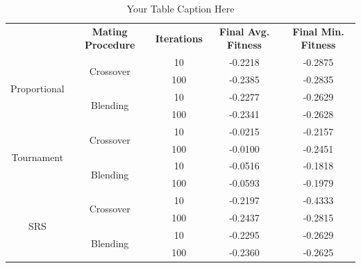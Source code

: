 \documentclass[10pt]{article}
\begin{document}
\begin{table}[H]
    \centering
    \begin{tabular}{|*{5}{c|}}
        \hline
        \renewcommand{\arraystretch}{1.5}
        \multirow{2}{*}{\textbf{Selection Method}} & \multirow{2}{*}{\textbf{Mating Procedure}} & \multirow{2}{*}{\textbf{Iterations}} & \multirow{2}{*}{\textbf{Final Avg. Fitness}} & \multirow{2}{*}{\textbf{Final Min. Fitness}} \\
        & & & & \\
        \hline
        \multirow{4}{*}{Proportional} & \multirow{2}{*}{Crossover} & 10 & -0.2218 & -0.2875 \\
        & &\cellcolor{lightgray} 100 &\cellcolor{lightgray} -0.2385 &\cellcolor{lightgray} -0.2835 \\
        \cline{2-5}
        & \multirow{2}{*}{Blending} & 10 & -0.2277 & -0.2629 \\
        & &\cellcolor{lightgray} 100 &\cellcolor{lightgray} -0.2341 & \cellcolor{lightgray} -0.2628 \\
        \hline
        \multirow{4}{*}{Tournament} & \multirow{2}{*}{Crossover} & 10 & -0.0215 & -0.2157 \\
        & &\cellcolor{lightgray} 100 &\cellcolor{lightgray} -0.0100 &\cellcolor{lightgray} -0.2451 \\
        \cline{2-5}
        & \multirow{2}{*}{Blending} & 10 & -0.0516 & -0.1818 \\
        & &\cellcolor{lightgray} 100 &\cellcolor{lightgray} -0.0593 &\cellcolor{lightgray} -0.1979 \\
        \hline
        \multirow{4}{*}{SRS} & \multirow{2}{*}{Crossover} & 10 & -0.2197 & -0.4333 \\
        & &\cellcolor{lightgray} 100 &\cellcolor{lightgray} -0.2437 &\cellcolor{lightgray} -0.2815 \\
        \cline{2-5}
        & \multirow{2}{*}{Blending} & 10 & -0.2295 & -0.2629 \\
        & &\cellcolor{lightgray} 100 &\cellcolor{lightgray} -0.2360 &\cellcolor{lightgray} -0.2625 \\
        \hline
    \end{tabular}
    \caption{Your Table Caption Here}
    \label{tab:mytable}
\end{table}
\end{document}
